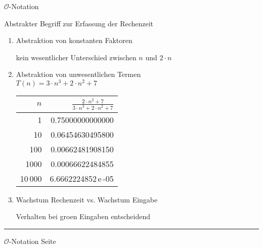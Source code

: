 \documentclass{slides}
\newcommand{\Oh}{\mathcal{O}}
\newcounter{mypage}
\newcommand{\bruch}[2]{\frac{\displaystyle#1}{\displaystyle#2}}
\begin{document}
\begin{slide}{}
\begin{center}
$\Oh$-Notation
\end{center}

\footnotesize
Abstrakter Begriff zur Erfassung der Rechenzeit
\begin{enumerate}
\item Abstraktion von konstanten Faktoren

      kein wesentlicher Unterschied zwischen $n$ und $2\cdot n$
\item Abstraktion von unwesentlichen Termen 
      \\[0.5cm]
      \hspace*{1.3cm} $T(n) = 3 \cdot n^3 + 2 \cdot n^2 + 7$ 
      \\[0.5cm]
      \hspace*{1.3cm} 
      \begin{tabular}{|r|r|}
        \hline
        $n$  & \rule{0pt}{16pt} $\bruch{2 \cdot n^2 + 7}{3 \cdot n^3 + 2 \cdot n^2 + 7}$ \\[0.3cm]
        \hline
        \hline
        1       &  0.75000000000000  \\
        10      &  0.06454630495800  \\
        100     &  0.00662481908150  \\
        1000    &  0.00066622484855  \\
        10\,000 &  6.6662224852\,e\,-05  \\
       \hline
      \end{tabular}
\item Wachstum Rechenzeit vs. Wachstum Eingabe

      Verhalten bei gro\3en Eingaben entscheidend 
\end{enumerate}

\vspace*{\fill}
\tiny \addtocounter{mypage}{1}
\rule{17cm}{1mm}
$\Oh$-Notation  \hspace*{\fill} Seite 
\end{slide}

\end{document}
